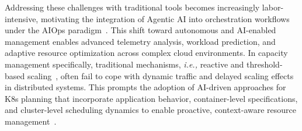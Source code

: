 \documentclass[sigconf]{acmart}
\begin{document}
Addressing these challenges with traditional tools becomes increasingly labor-intensive, motivating the integration of Agentic AI into orchestration workflows under the AIOps paradigm~\cite{shetty2024building}. This shift toward autonomous and AI-enabled management enables advanced telemetry analysis, workload prediction, and adaptive resource optimization across complex cloud environments. In capacity management specifically, traditional mechanisms, \textit{i.e.,} reactive and threshold-based scaling~\cite{yu2020microscaler, rossi2020self, rossi2020geo, xu2025auto, ahmad2025towards}, often fail to cope with dynamic traffic and delayed scaling effects in distributed systems. This prompts the adoption of AI-driven approaches for K8s planning that incorporate application behavior, container-level specifications, and cluster-level scheduling dynamics to enable proactive, context-aware resource management~\cite{khaleq2021intelligent, nguyen2022graph, song2023chainsformer, subramaniam2023automated, santos2023gym, quattrocchi2024autoscaling}.
\end{document}

